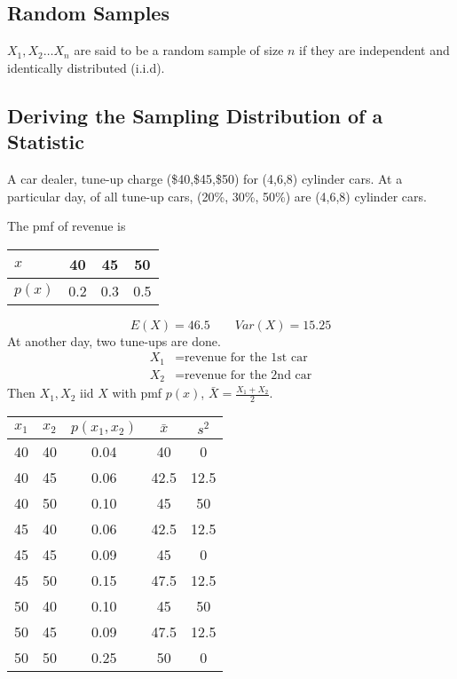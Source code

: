 \subsection{Random Samples}
\begin{defn}
$X_1,X_2 \dots X_n$ are said to be a random sample of size $n$ if they are independent and identically distributed (i.i.d).
\end{defn}

\subsection{Deriving the Sampling Distribution of a Statistic}
\begin{exmp}
A car dealer, tune-up charge (\$40,\$45,\$50) for (4,6,8) cylinder cars. At a particular day, of all tune-up cars, (20\%, 30\%, 50\%) are (4,6,8) cylinder cars.

The pmf of revenue is

\begin{center}
\begin{tabular}{|l|c|c|c|}
\hline
$x$ & 40 & 45 & 50\\
\hline
$p(x)$ & 0.2 & 0.3 & 0.5 \\
\hline
\end{tabular}
\end{center}
\[E(X)=46.5 \qquad Var(X)=15.25\]
At another day, two tune-ups are done.
\begin{align*}
X_1&=\text{revenue for the 1st car}\\
X_2&=\text{revenue for the 2nd car}
\end{align*}
Then $X_1, X_2$ iid $X$ with pmf $p(x)$, $\bar{X}=\frac{X_1+X_2}{2}$.
\begin{center}
\begin{tabular}{|l|l|c|c|c|}
\hline
$x_1$ &$x_2$ & $p(x_1,x_2)$ & $\bar{x}$ & $s^2$\\
\hline
40 & 40 & 0.04 & 40 & 0 \\
\hline
40 & 45 & 0.06 & 42.5 & 12.5 \\
\hline
40 & 50 & 0.10 & 45 & 50 \\
\hline
45 & 40 & 0.06 & 42.5 & 12.5 \\
\hline
45 & 45 & 0.09 & 45 & 0 \\
\hline
45 & 50 & 0.15 & 47.5 & 12.5 \\
\hline
50 & 40 & 0.10 & 45 & 50 \\
\hline
50 & 45 & 0.09 & 47.5 & 12.5 \\
\hline
50 & 50 & 0.25 & 50 & 0 \\
\hline
\end{tabular}
\end{center}


\end{exmp}

